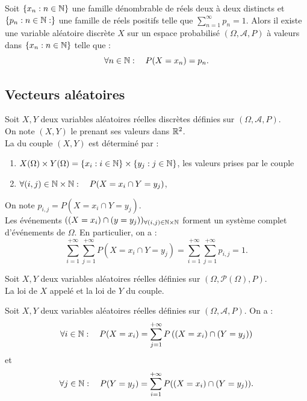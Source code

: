 \documentclass{book}
\begin{document}
\begin{Theoreme}
Soit $\{x_n:n\in\mathbb{N}\}$ une famille dénombrable de réels deux à deux distincts et $\{p_n : n\in\mathbb{N}:\}$ une famille de réels positifs telle que $\sum_{n=1}^{\infty} p_n = 1$. Alors il existe 
une variable aléatoire discrète $X$ sur un
espace probabilisé $(\Omega,\mathcal{A},P)$ à valeurs dans  $\{x_n:n\in\mathbb{N}\}$ telle que : 
$$ \forall n \in \mathbb{N}:\quad  P( X = x_n ) = p_n.$$
\end{Theoreme}

\subsection{Vecteurs aléatoires}
\begin{Definition}
Soit $X,Y$ deux variables aléatoires réelles discrètes définies sur $(\Omega,\mathcal{A},P)$.\\
On note  $(X,Y)$ le  prenant ses valeurs dans $\mathbb{R}^2$.\\
La  du couple $(X,Y)$ est déterminé par  :
\begin{enumerate}
\item $X(\Omega)\times Y(\Omega)=\{x_i:i\in \mathbb{N}\}\times \{y_j:j\in \mathbb{N}\} $, les valeurs prises par le couple
\item $\forall (i,j)\in \mathbb{N}\times \mathbb{N}:\quad P(X=x_i\cap Y=y_j)$,
\end{enumerate}
On note $p_{i,j}=P(X=x_i\cap Y=y_j)$.\\
Les événements $((X=x_i)\cap (y=y_j))_{\forall (i,j)\in \mathbb{N}\times \mathbb{N}}$ forment un système complet d'événements de $\Omega$. En particulier, on a : 
$$\sum_{i=1}^{+\infty} \sum_{j=1}^{+\infty}P(X=x_i\cap Y=y_j)=\sum_{i=1}^{+\infty} \sum_{j=1}^{+\infty}p_{i,j}=1.$$ 
\end{Definition}
\begin{Definition}
Soit $X,Y$ deux variables aléatoires réelles définies sur $(\Omega,\mathcal{P}(\Omega),P)$.\\
La loi de $X$ appelé  et la loi de $Y$  du couple.
\end{Definition}
\begin{Proposition}[Relations]
Soit $X,Y$ deux variables aléatoires réelles définies sur $(\Omega,\mathcal{A},P)$. On a :
$$\forall i\in \mathbb{N}: \quad P(X=x_i)=\sum_{j=1}^{+\infty}P\left((X=x_i)\cap (Y=y_j)\right)$$
et 
$$\forall j\in \mathbb{N}: \quad P(Y=y_j)=\sum_{i=1}^{+\infty }P((X=x_i)\cap (Y=y_j)).$$ 
\end{Proposition}
\end{document}
